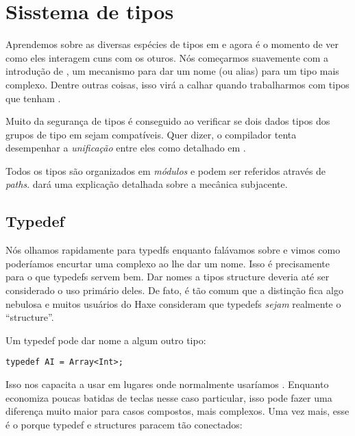 \chapter{Sisstema de tipos}
\label{type-system}

Aprendemos sobre as diversas espécies de tipos em   e agora é o momento de ver como eles interagem cuns com os oturos. Nós começarmos suavemente com a introdução de , um mecanismo para dar um nome (ou alias) para um tipo mais complexo. Dentre outras coisas, isso virá a calhar quando trabalharmos com tipos que tenham .

Muito da segurança de tipos é conseguido ao verificar se dois dados tipos dos grupos de tipo em  sejam compatíveis. Quer dizer, o compilador tenta desempenhar a \emph{unificação} entre eles como detalhado em .

Todos os tipos são organizados em \emph{módulos} e podem ser referidos através de \emph{paths}.  dará uma explicação detalhada sobre a mecânica subjacente.

\section{Typedef}
\label{type-system-typedef}

Nós olhamos rapidamente para typedfs enquanto falávamos sobre  e vimos como poderíamos encurtar uma  complexo ao lhe dar um nome. Isso é precisamente para o que typedefs servem bem.  Dar nomes a tipos structure deveria até ser considerado o uso primário deles. De fato, é tão comum que a distinção fica algo nebulosa e muitos usuários do Haxe consideram que typedefs \emph{sejam} realmente o ``structure''.

Um typedef pode dar nome a algum outro tipo:

\begin{lstlisting}
typedef AI = Array<Int>;
\end{lstlisting}
Isso nos capacita a usar  em lugares onde normalmente usaríamos . Enquanto economiza poucas batidas de teclas nesse caso particular, isso pode fazer uma diferença muito maior para casos compostos, mais complexos. Uma vez mais, esse é o porque typedef e structures paracem tão conectados:

